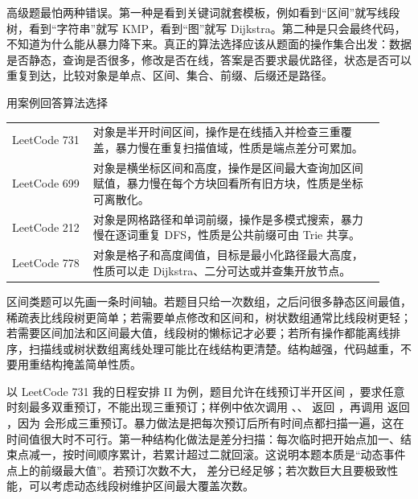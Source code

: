 
高级题最怕两种错误。第一种是看到关键词就套模板，例如看到“区间”就写线段树，看到“字符串”就写 KMP，看到“图”就写 Dijkstra。第二种是只会最终代码，不知道为什么能从暴力降下来。真正的算法选择应该从题面的操作集合出发：数据是否静态，查询是否很多，修改是否在线，答案是否要求最优路径，状态是否可以重复到达，比较对象是单点、区间、集合、前缀、后缀还是路径。

\begin{principlebox}{用案例回答算法选择}
\begin{tabular}{@{}p{0.2\linewidth}p{0.72\linewidth}@{}}
LeetCode 731 & 对象是半开时间区间，操作是在线插入并检查三重覆盖，暴力慢在重复扫描值域，性质是端点差分可累加。\\
LeetCode 699 & 对象是横坐标区间和高度，操作是区间最大查询加区间赋值，暴力慢在每个方块回看所有旧方块，性质是坐标可离散化。\\
LeetCode 212 & 对象是网格路径和单词前缀，操作是多模式搜索，暴力慢在逐词重复 DFS，性质是公共前缀可由 Trie 共享。\\
LeetCode 778 & 对象是格子和高度阈值，目标是最小化路径最大高度，性质可以走 Dijkstra、二分可达或并查集开放节点。\\
\end{tabular}
\end{principlebox}

区间类题可以先画一条时间轴。若题目只给一次数组，之后问很多静态区间最值，稀疏表比线段树更简单；若需要单点修改和区间和，树状数组通常比线段树更轻；若需要区间加法和区间最大值，线段树的懒标记才必要；若所有操作都能离线排序，扫描线或树状数组离线处理可能比在线结构更清楚。结构越强，代码越重，不要用重结构掩盖简单性质。

以 LeetCode 731 我的日程安排 II 为例，题目允许在线预订半开区间 \code{[start,end)}，要求任意时刻最多双重预订，不能出现三重预订；样例中依次调用 、、 返回 ，再调用  返回 ，因为 \code{[10,15)} 会形成三重预订。暴力做法是把每次预订后所有时间点都扫描一遍，这在时间值很大时不可行。第一种结构化做法是差分扫描：每次临时把开始点加一、结束点减一，按时间顺序累计，若累计超过二就回滚。这说明本题本质是“动态事件点上的前缀最大值”。若预订次数不大， 差分已经足够；若次数巨大且要极致性能，可以考虑动态线段树维护区间最大覆盖次数。

